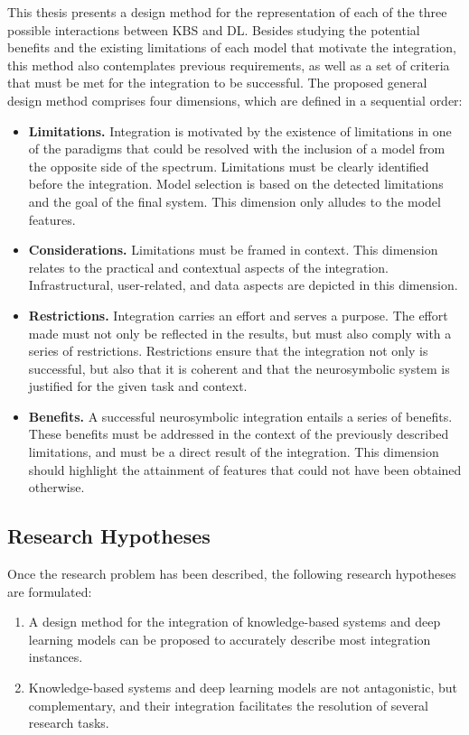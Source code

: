 This thesis presents a design method for the representation of each of the three possible interactions between KBS and DL. Besides studying the potential benefits and the existing limitations of each model that motivate the integration, this method also contemplates previous requirements, as well as a set of criteria that must be met for the integration to be successful. The proposed general design method comprises four dimensions, which are defined in a sequential order:
\begin{itemize}
    \item \textbf{Limitations.} Integration is motivated by the existence of limitations in one of the paradigms that could be resolved with the inclusion of a model from the opposite side of the spectrum. Limitations must be clearly identified before the integration. Model selection is based on the detected limitations and the goal of the final system. This dimension only alludes to the model features.
    
    \item \textbf{Considerations.} Limitations must be framed in context. This dimension relates to the practical and contextual aspects of the integration. Infrastructural, user-related, and data aspects are depicted in this dimension.
    
    \item \textbf{Restrictions.} Integration carries an effort and serves a purpose. The effort made must not only be reflected in the results, but must also comply with a series of restrictions. Restrictions ensure that the integration not only is successful, but also that it is coherent and that the neurosymbolic system is justified for the given task and context.
    
    \item \textbf{Benefits.} A successful neurosymbolic integration entails a series of benefits. These benefits must be addressed in the context of the previously described limitations, and must be a direct result of the integration. This dimension should highlight the attainment of features that could not have been obtained otherwise.
\end{itemize}

\subsection{Research Hypotheses}
Once the research problem has been described, the following research hypotheses are formulated:
\begin{enumerate} [start=1,label={\bfseries H\arabic*:}]
    \item A design method for the integration of knowledge-based systems and deep learning models can be proposed to accurately describe most integration instances. 
    \item Knowledge-based systems and deep learning models are not antagonistic, but complementary, and their integration facilitates the resolution of several research tasks.
\end{enumerate}

